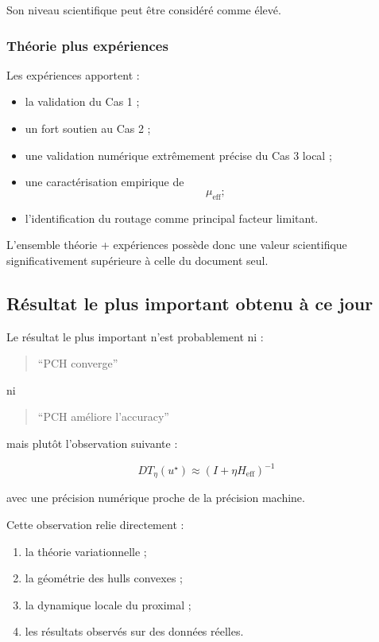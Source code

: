 Son niveau scientifique peut être considéré comme élevé.

\subsubsection{Théorie plus expériences}

Les expériences apportent :

\begin{itemize}
    \item la validation du Cas 1 ;
    \item un fort soutien au Cas 2 ;
    \item une validation numérique extrêmement précise du Cas 3 local ;
    \item une caractérisation empirique de
    \[
    \mu_{\mathrm{eff}};
    \]
    \item l'identification du routage comme principal facteur limitant.
\end{itemize}

L'ensemble théorie + expériences possède donc une valeur scientifique significativement supérieure à celle du document seul.

\subsection{Résultat le plus important obtenu à ce jour}

Le résultat le plus important n'est probablement ni :

\begin{quote}
``PCH converge''
\end{quote}

ni

\begin{quote}
``PCH améliore l'accuracy''
\end{quote}

mais plutôt l'observation suivante :

\[
\boxed{
DT_\eta(u^\star)
\approx
(I+\eta H_{\mathrm{eff}})^{-1}
}
\]

avec une précision numérique proche de la précision machine.

Cette observation relie directement :

\begin{enumerate}
    \item la théorie variationnelle ;
    \item la géométrie des hulls convexes ;
    \item la dynamique locale du proximal ;
    \item les résultats observés sur des données réelles.
\end{enumerate}

